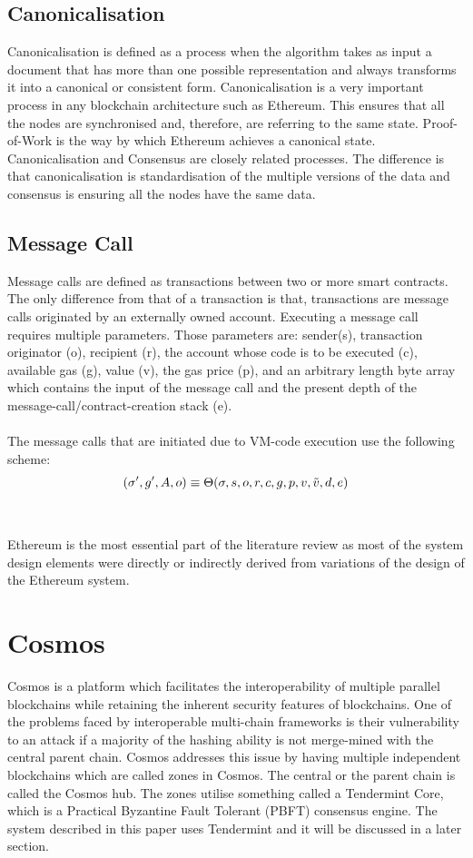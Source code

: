 \documentclass[a4paper,twoside,phd]{BYUPhys}
\begin{document}
\subsection{Canonicalisation}
Canonicalisation is defined as a process when the algorithm takes as input a document that has more than one possible representation and always transforms it into a canonical or consistent form. Canonicalisation is a very important process in any blockchain architecture such as Ethereum. This ensures that all the nodes are synchronised and, therefore, are referring to the same state. Proof-of-Work is the way by which Ethereum achieves a canonical state. Canonicalisation and Consensus are closely related processes. The difference is that canonicalisation is standardisation of the multiple versions of the data and consensus is ensuring all the nodes have the same data.
\subsection{Message Call}
Message calls are defined as transactions between two or more smart contracts. The only difference from that of a transaction is that, transactions are message calls originated by an externally owned account. Executing a message call requires multiple parameters. Those parameters are: sender(s), transaction originator (o), recipient (r), the account whose code is to be executed (c), available gas (g), value (v), the gas price (p), and an arbitrary length byte array which contains the input of the message call and the present depth of the message-call/contract-creation stack (e).
\\ 
\\ 
The message calls that are initiated due to VM-code execution use the following scheme:
\[(\sigma', g', A, o)\equiv \Theta(\sigma, s, o, r, c, g, p, v, \Tilde{v}, d, e)\]
\\
\\
Ethereum is the most essential part of the literature review as most of the system design elements were directly or indirectly derived from variations of the design of the Ethereum system. 
\section{Cosmos}
Cosmos is a platform which facilitates the interoperability of multiple parallel blockchains while retaining the inherent security features of blockchains. One of the problems faced by interoperable multi-chain frameworks is their vulnerability to an attack if a majority of the hashing ability is not merge-mined with the central parent chain. Cosmos addresses this issue by having multiple independent blockchains which are called zones in Cosmos. The central or the parent chain is called the Cosmos hub. The zones utilise something called a Tendermint Core, which is a Practical Byzantine Fault Tolerant (PBFT) consensus engine. The system described in this paper uses Tendermint and it will be discussed in a later section.
\end{document}
